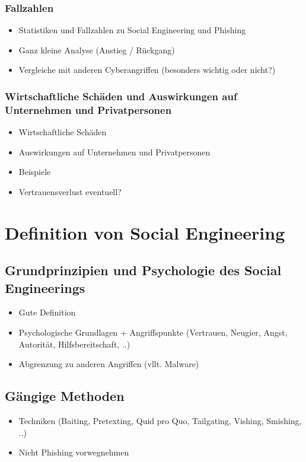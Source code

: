 \documentclass[12pt, a4paper, oneside]{scrartcl}
\begin{document}
\subsubsection{Fallzahlen}
\begin{itemize}
  \item Statistiken und Fallzahlen zu Social Engineering und Phishing
  \item Ganz kleine Analyse (Anstieg / Rückgang)
  \item Vergleiche mit anderen Cyberangriffen (besonders wichtig oder nicht?)
\end{itemize}

\subsubsection{Wirtschaftliche Schäden und Auswirkungen auf Unternehmen und Privatpersonen}
\begin{itemize}
  \item Wirtschaftliche Schäden
  \item Auswirkungen auf Unternehmen und Privatpersonen
  \item Beispiele
  \item Vertrauensverlust eventuell?
\end{itemize}


\clearpage
\section{Definition von Social Engineering}

\subsection{Grundprinzipien und Psychologie des Social Engineerings}
\begin{itemize}
  \item Gute Definition
  \item Psychologische Grundlagen + Angriffspunkte (Vertrauen, Neugier, Angst, Autorität, Hilfsbereitschaft, ..)
  \item Abgrenzung zu anderen Angriffen (vllt. Malware)
\end{itemize}

\subsection{Gängige Methoden}
\begin{itemize}
  \item Techniken (Baiting, Pretexting, Quid pro Quo, Tailgating, Vishing, Smishing, ..)
  \item Nicht Phishing vorwegnehmen
\end{itemize}
\end{document}
